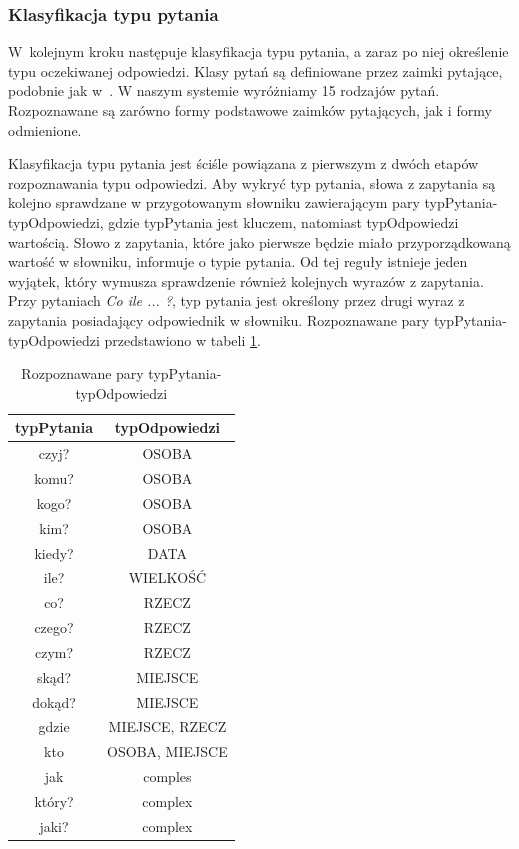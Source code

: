 \subsubsection{Klasyfikacja typu pytania}
W~kolejnym kroku następuje klasyfikacja typu pytania, a zaraz po niej określenie typu oczekiwanej odpowiedzi. Klasy pytań są definiowane przez zaimki pytające, podobnie jak w~\cite{gupta2012survey}. W naszym systemie wyróżniamy 15 rodzajów pytań. Rozpoznawane są zarówno formy podstawowe zaimków pytających, jak i formy odmienione.

Klasyfikacja typu pytania jest ściśle powiązana z pierwszym z dwóch etapów rozpoznawania typu odpowiedzi. Aby wykryć typ pytania, słowa z zapytania są kolejno sprawdzane w przygotowanym słowniku zawierającym pary typPytania-typOdpowiedzi, gdzie typPytania jest kluczem, natomiast typOdpowiedzi wartością. Słowo z zapytania, które jako pierwsze będzie miało przyporządkowaną wartość w słowniku, informuje o typie pytania. Od tej reguły istnieje jeden wyjątek, który wymusza sprawdzenie również kolejnych wyrazów z zapytania. Przy pytaniach \emph{Co ile ... ?}, typ pytania jest określony przez drugi wyraz z zapytania posiadający odpowiednik w słowniku. Rozpoznawane pary typPytania-typOdpowiedzi przedstawiono w tabeli \ref{tab:tabelaPytOdp}.

\begin{table}[h]
	\centering
	\begin{tabular}{|c|c| }
		
		 \hline
		\textbf{typPytania} & \textbf{typOdpowiedzi}  \\ \hline
		czyj? & OSOBA \\  \hline
		komu? & OSOBA \\ \hline
		kogo? & OSOBA \\ \hline
		kim? & OSOBA \\ \hline
		kiedy? & DATA \\  \hline
		ile? & WIELKOŚĆ \\  \hline
		co? & RZECZ \\  \hline
		czego? & RZECZ \\ \hline
		czym? & RZECZ \\ \hline
		skąd? & MIEJSCE \\ \hline
		dokąd? & MIEJSCE \\ \hline
		gdzie & MIEJSCE, RZECZ \\ \hline
		kto & OSOBA, MIEJSCE \\ \hline
		jak & comples \\ \hline
		który? & complex \\ \hline
		jaki? & complex  \\  \hline
	\end{tabular}
	\caption{Rozpoznawane pary typPytania-typOdpowiedzi}

\label{tab:tabelaPytOdp}

\end{table}

